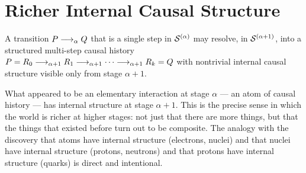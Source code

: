 \section{Richer Internal Causal Structure}

\begin{proposition}
\label{prop:resolution}
A transition $P \longrightarrow_\alpha Q$ that is a single step in
$\mathcal{S}^{(\alpha)}$ may resolve, in $\mathcal{S}^{(\alpha+1)}$, into a
structured multi-step causal history
$P = R_0 \longrightarrow_{\alpha+1} R_1 \longrightarrow_{\alpha+1} \cdots
\longrightarrow_{\alpha+1} R_k = Q$
with nontrivial internal causal structure visible only from
stage $\alpha+1$.
\end{proposition}

\begin{remark}
What appeared to be an elementary interaction at stage $\alpha$ ---
an atom of causal history --- has internal structure at stage
$\alpha+1$.
This is the precise sense in which the world is richer at higher
stages: not just that there are more things, but that the things
that existed before turn out to be composite.
The analogy with the discovery that atoms have internal structure
(electrons, nuclei) and that nuclei have internal structure
(protons, neutrons) and that protons have internal structure (quarks)
is direct and intentional.
\end{remark}


